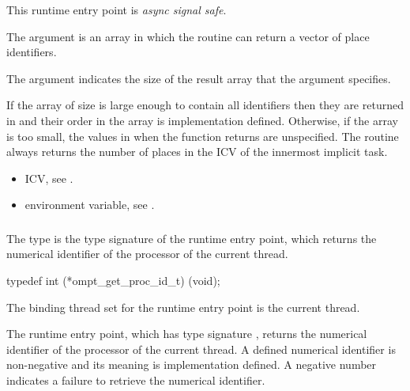 This runtime entry point is \emph{async signal safe}.

\argdesc
The  argument is an array in which the routine can 
return a vector of place identifiers.

The  argument indicates the size of the result
array that the  argument specifies.

\effect
If the  array of size  is large 
enough to contain all identifiers then they are returned in  
and their order in the array is implementation defined. Otherwise, if the 
 array is too small, the values in  when 
the function returns are unspecified. The routine always returns the number 
of places in the  ICV of the innermost implicit task.

\crossreferences
\begin{itemize}
\item {} ICV, see
.

\item {} environment variable, see
.
\end{itemize}



\subsubsection{}
\label{sec:ompt_get_proc_id_t}
\label{sec:ompt_get_proc_id}

\summary
The  type is the type signature of the 
 runtime entry point, which returns the
numerical identifier of the processor of the current thread.

\format
\begin{ccppspecific}
\begin{omptInquiry}
typedef int (*ompt_get_proc_id_t) (void);
\end{omptInquiry}
\end{ccppspecific}

\binding
The binding thread set for the  runtime entry point
is the current thread.

\descr
The  runtime entry point, which has type signature
, returns the numerical identifier of the processor 
of the current thread. A defined numerical identifier is non-negative and
its meaning is implementation defined. A negative number indicates a failure 
to retrieve the numerical identifier.

